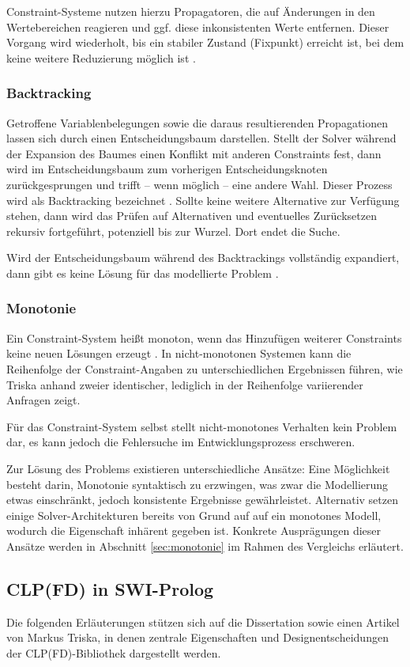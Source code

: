 \documentclass[12pt,a4paper]{article}
\begin{document}
Constraint-Systeme nutzen hierzu Propagatoren, die auf Änderungen in den Wertebereichen reagieren und ggf. diese inkonsistenten Werte entfernen.
Dieser Vorgang wird wiederholt, bis ein stabiler Zustand (Fixpunkt) erreicht ist, bei dem keine weitere Reduzierung möglich ist \cite{clp_handbook}.
\subsubsection{Backtracking}
\label{sec:backtracking}
Getroffene Variablenbelegungen sowie die daraus resultierenden Propagationen lassen sich durch einen Entscheidungsbaum darstellen.
Stellt der Solver während der Expansion des Baumes einen Konflikt mit anderen Constraints fest, dann wird im Entscheidungsbaum zum vorherigen Entscheidungsknoten zurückgesprungen und trifft -- wenn möglich -- eine andere Wahl.
Dieser Prozess wird als Backtracking bezeichnet \cite{clp_handbook}. 
Sollte keine weitere Alternative zur Verfügung stehen, dann wird das Prüfen auf Alternativen und eventuelles Zurücksetzen rekursiv fortgeführt, potenziell bis zur Wurzel.
Dort endet die Suche.

Wird der Entscheidungsbaum während des Backtrackings vollständig expandiert, dann gibt es keine Lösung für das modellierte Problem \cite{clp_book2}.
\subsubsection{Monotonie}
Ein Constraint-System heißt monoton, wenn das Hinzufügen weiterer Constraints keine neuen Lösungen erzeugt \cite{drt,swi-clpfd-doc}.
In nicht-monotonen Systemen kann die Reihenfolge der Constraint-Angaben zu unterschiedlichen Ergebnissen führen, wie Triska \cite[S. 37]{drt} anhand zweier identischer, lediglich in der Reihenfolge variierender Anfragen zeigt.

Für das Constraint-System selbst stellt nicht-monotones Verhalten kein Problem dar, es kann jedoch die Fehlersuche im Entwicklungsprozess erschweren.

Zur Lösung des Problems existieren unterschiedliche Ansätze: Eine Möglichkeit besteht darin, Monotonie syntaktisch zu erzwingen, was zwar die Modellierung etwas einschränkt, jedoch konsistente Ergebnisse gewährleistet.
Alternativ setzen einige Solver-Architekturen bereits von Grund auf auf ein monotones Modell, wodurch die Eigenschaft inhärent gegeben ist.
Konkrete Ausprägungen dieser Ansätze werden in Abschnitt \ref{sec:monotonie} im Rahmen des Vergleichs erläutert.
\subsection{CLP(FD) in SWI-Prolog}
\label{sec:clpfd}
Die folgenden Erläuterungen stützen sich auf die Dissertation \cite{drt} sowie einen Artikel \cite{clpfd} von Markus Triska, in denen zentrale Eigenschaften und Designentscheidungen der CLP(FD)-Bibliothek dargestellt werden.
\end{document}
